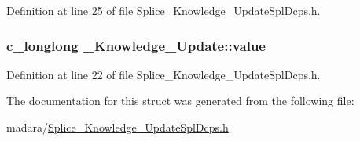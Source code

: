 Definition at line 25 of file Splice\_\-Knowledge\_\-UpdateSplDcps.h.

\hypertarget{struct__Knowledge__Update_abdef46590ce83f06bbcb422af7bbc101}{
\subsubsection[{value}]{\setlength{\rightskip}{0pt plus 5cm}c\_\-longlong {\bf \_\-Knowledge\_\-Update::value}}}
\label{dd/dc6/struct__Knowledge__Update_abdef46590ce83f06bbcb422af7bbc101}


Definition at line 22 of file Splice\_\-Knowledge\_\-UpdateSplDcps.h.



The documentation for this struct was generated from the following file:\begin{DoxyCompactItemize}
\item 
madara/\hyperlink{Splice__Knowledge__UpdateSplDcps_8h}{Splice\_\-Knowledge\_\-UpdateSplDcps.h}\end{DoxyCompactItemize}
